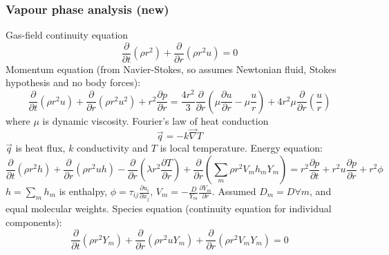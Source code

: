\documentclass[12pt]{report}
\begin{document}
\subsubsection{Vapour phase analysis (new)}

Gas-field continuity equation
\begin{equation}
  \frac{\partial}{\partial t} ( \rho r^2 ) +
  \frac{\partial}{\partial r} ( \rho r^2 u ) = 0
\end{equation}
Momentum equation (from Navier-Stokes, so assumes Newtonian fluid, Stokes hypothesis and no body forces):
\begin{equation}
  \frac{\partial}{\partial t} ( \rho r^2 u ) +
  \frac{\partial}{\partial r} ( \rho r^2 u^2 ) +
  r^2 \frac{\partial p}{\partial r}
  = \frac{4 r^2}{3} \frac{\partial}{\partial r}
  \left( \mu \frac{\partial u}{\partial r} - \mu \frac{u}{r} \right)
  + 4 r^2 \mu \frac{\partial}{\partial r} \left( \frac{u}{r} \right)
\end{equation}
where $\mu$ is dynamic viscosity.
Fourier's law of heat conduction
\begin{equation}
  \vec{q} = -k \vec{\nabla} T
\end{equation}
$\vec{q}$ is heat flux, $k$ conductivity and $T$ is local temperature.
Energy equation:
\begin{equation}
  \frac{\partial}{\partial t} ( \rho r^2 h ) +
  \frac{\partial}{\partial r} ( \rho r^2 u h ) -
  \frac{\partial}{\partial r} ( \lambda r^2 \frac{\partial T}{\partial r} ) +
  \frac{\partial}{\partial r} ( \sum_m \rho r^2 V_m h_m Y_m ) =
  r^2 \frac{\partial p}{\partial t} +
  r^2 u \frac{\partial p}{\partial r} + r^2 \phi
\end{equation}
$h = \sum_m h_m$ is enthalpy, $\phi = \tau_{ij} \frac{\partial u_i}{\partial x_j}$, $V_m = - \frac{D}{Y_m} \frac{\partial Y_m}{\partial r}$.
Assumed $D_m = D \forall m$, and equal molecular weights.
Species equation (continuity equation for individual components):
\begin{equation}
  \frac{\partial}{\partial t} ( \rho r^2 Y_m ) +
  \frac{\partial}{\partial r} ( \rho r^2 u Y_m ) +
  \frac{\partial}{\partial r} ( \rho r^2 V_m Y_m ) = 0
\end{equation}
\end{document}
